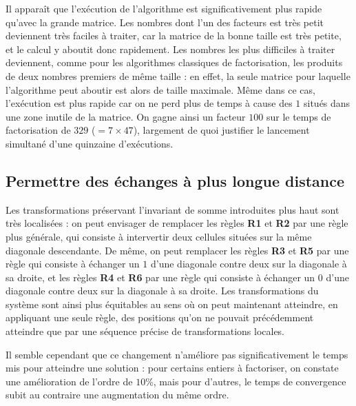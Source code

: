 \documentclass[11pt, openany]{article}
\begin{document}
\medskip
Il apparaît que l'exécution de l'algorithme est significativement plus rapide qu'avec la grande matrice. Les nombres dont l'un des facteurs est très petit deviennent très faciles à traiter, car la matrice de la bonne taille est très petite, et le calcul y aboutit donc rapidement. Les nombres les plus difficiles à traiter deviennent, comme pour les algorithmes classiques de factorisation, les produits de deux nombres premiers de même taille : en effet, la seule matrice pour laquelle l'algorithme peut aboutir est alors de taille maximale. Même dans ce cas, l'exécution est plus rapide car on ne perd plus de temps à cause des $1$ situés dans une zone inutile de la matrice. On gagne ainsi un facteur $100$ sur le temps de factorisation de $329$ ($ =7\times 47$), largement de quoi justifier le lancement simultané d'une quinzaine d'exécutions. %


\subsection*{Permettre des échanges à plus longue distance}

Les transformations préservant l'invariant de somme introduites plus haut sont très localisées : on peut envisager de remplacer les règles \textbf{R1} et \textbf{R2} par une règle plus générale, qui consiste à intervertir deux cellules situées sur la même diagonale descendante. De même, on peut remplacer les règles \textbf{R3} et \textbf{R5} par une règle qui consiste à échanger un $1$ d'une diagonale contre deux sur la diagonale à sa droite, et les règles \textbf{R4} et \textbf{R6} par une règle qui consiste à échanger un $0$ d'une diagonale contre deux sur la diagonale à sa droite. Les transformations du système sont ainsi plus équitables au sens où on peut maintenant atteindre, en appliquant une seule règle, des positions qu'on ne pouvait précédemment atteindre que par une séquence précise de transformations locales. 

Il semble cependant que ce changement n'améliore pas significativement le temps mis pour atteindre une solution : pour certains entiers à factoriser, on constate une amélioration de l'ordre de $10\%$, mais pour d'autres, le temps de convergence subit au contraire une augmentation du même ordre.   

\end{document}
